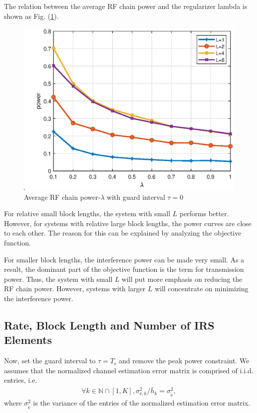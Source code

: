 \documentclass[12pt,draftclsnofoot,onecolumn,journal]{IEEEtran}
\begin{document}
The relation between the average RF chain power and the regularizer lambda is shown as Fig. (\ref{fig:powerlambda}).
\begin{figure}[htbp]\flushleft
\includegraphics[width=6in]{lmdpower.eps} 
\caption{Average RF chain power-$\lambda$ with guard interval $\tau=0$} \label{fig:powerlambda}
\end{figure}
For relative small block lengths, the system with small $L$ performs better. However, for systems with relative large block lengths, the power curves are close to each other. The reason for this can be explained by analyzing the objective function. 

For smaller block lengths, the interference power can be made very small. As a result, the dominant part of the objective function is the term for transmission power. Thus, the system with small $L$ will put more emphasis on reducing the RF chain power. However, systems with larger $L$ will concentrate on minimizing the interference power. 

\subsection{Rate, Block Length and Number of IRS Elements}
Now, set the guard interval to $\tau=T_{\mathrm{s}}$ and remove the peak power constraint. We assumes that the normalized channel estimation error matrix is comprised of i.i.d. entries, i.e. 
\begin{equation}
\begin{split}
\forall k\in\mathbb N\cap[1, K], \sigma_{\mathrm{e},{k}}^2/\bar{h}_k=\sigma_{\tilde{\mathrm e}}^2,
\end{split}
\end{equation}
where $\sigma_{\tilde{\mathrm e}}^2$ is the variance of the entries of the normalized estimation error matrix.
\end{document}
